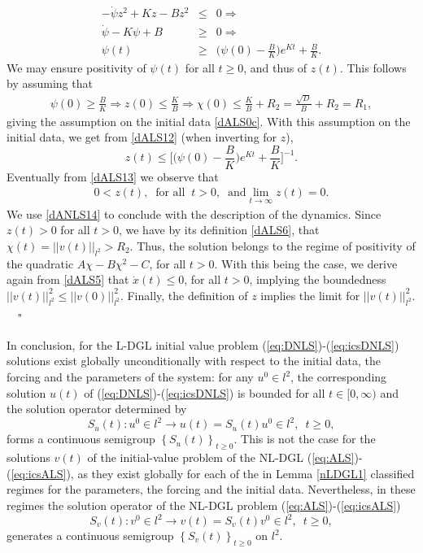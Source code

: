\documentclass[preprintnumbers,amsmath,amssymb]{revtex4}
\begin{document}
\begin{eqnarray}
\label{dALS12}
-\dot{\psi}z^2+Kz-Bz^2&\leq& 0\Rightarrow\nonumber\\
\dot{\psi}-K\psi+B&\geq& 0\Rightarrow\nonumber\\
\psi(t)&\geq & \bigg(\psi(0)-\frac{B}{K}\bigg)e^{Kt}+\frac{B}{K}.
\end{eqnarray}
We may ensure positivity of $\psi(t)$ for all $t\geq 0$, and thus of $z(t)$. This follows  by assuming that 
\begin{eqnarray*}
	\psi(0)\geq\frac{B}{K}\Longrightarrow z(0)\leq\frac{K}{B}\Longrightarrow \chi(0)\leq \frac{K}{B}+R_2=\frac{\sqrt{D}}{B}+R_2=R_1,
\end{eqnarray*}
giving the assumption on the initial data \eqref{dALS0c}. With this assumption on the initial data, we get from \eqref{dALS12} (when inverting for $z$), 
\begin{equation}
\label{dALS13}
z(t)\leq \bigg[\bigg(\psi(0)-\frac{B}{K}\bigg)e^{Kt}+\frac{B}{K}\bigg]^{-1}.
\end{equation}
Eventually from  \eqref{dALS13} we observe that 
\begin{eqnarray}
\label{dANLS14}
0<z(t),\;\;\mbox{for all}\;\;t>0,\;\;\mbox{and} \lim_{t\rightarrow\infty}z(t)=0.
\end{eqnarray} 
We use \eqref{dANLS14} to conclude with the description of the dynamics. Since $z(t)>0$ for all $t>0$, we have by its definition \eqref{dALS6}, that $\chi(t)=||v(t)||_{l^2}>R_2$. Thus, the solution belongs to the regime of positivity of the quadratic  $A\chi-B\chi^2-C$, for all $t>0$. With this  being the case, we derive again from \eqref{dALS5} that $\dot{x}(t)\leq 0$, for all $t>0$, implying the boundedness $||v(t)||^2_{l^2}\leq ||v(0)||^2_{l^2}$.  Finally, the definition of $z$ implies the limit for $||v(t)||_{l^2}^2$. \ \ $\square$\\
%
\\
In conclusion, for the L-DGL initial value problem (\ref{eq:DNLS})-(\ref{eq:icsDNLS}) solutions exist globally unconditionally with respect to the initial data, the forcing and the parameters of the system: for any  
$u^0 \in l^2$,  
the corresponding solution $u (t)$  of (\ref{eq:DNLS})-(\ref{eq:icsDNLS}) 
is bounded 
for all $t\in [0,\infty)$ and the  solution operator determined by 
\begin{equation}
 S_u(t):u^0 \in l^2 \rightarrow  u(t)=S_u(t)u^0\in l^2,\,\,\,t\ge 0,
\end{equation}
forms a continuous semigroup $\left\{ S_u(t)\right\}_{t\ge 0}$.
This is not the case for the solutions  $v(t)$ of the initial-value problem of the NL-DGL (\ref{eq:ALS})-(\ref{eq:icsALS}), as they exist globally for each of the in  Lemma \ref{nLDGL1}  classified regimes for the parameters, the forcing and the initial data.  Nevertheless, in these regimes the solution operator  of the NL-DGL problem (\ref{eq:ALS})-(\ref{eq:icsALS})
\begin{equation}
 S_v(t):v^0 \in l^2 \rightarrow  v(t)=S_v(t)v^0\in l^2,\,\,\,t\ge 0,
\end{equation}
generates a continuous semigroup $\left\{ S_v(t)\right\}_{t\ge 0}$ on $l^2$.
\end{document}

